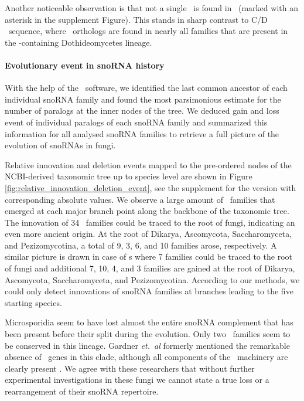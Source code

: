 Another noticeable observation is that not a single \haca\ is
found in \Ptt\ (marked with an asterisk in the supplement Figure). This stands in sharp contrast to C/D \sno\ sequence,
where \ptt\ orthologs are found in nearly all families that are
present in the \ptt-containing Dothideomycetes lineage.


\paragraph{\textbf{Evolutionary event in snoRNA history}}

With the help of the \epope\ software, we identified the last common ancestor of each individual snoRNA family and found the most parsimonious estimate for the number of paralogs at the inner nodes of the tree. 
We deduced gain and loss event of individual paralogs of each snoRNA family and summarized this information for all analysed snoRNA families to retrieve a full picture of the evolution of  snoRNAs in fungi.

Relative innovation and deletion events mapped to the pre-ordered
nodes of the NCBI-derived taxonomic tree up to species level are shown in
Figure \ref{fig:relative_innovation_deletion_event}, see the supplement for the version with corresponding absolute values.
We observe a large amount of \sno\ families that emerged at each
major branch point along the backbone of the taxonomic
tree. The innovation of 34 \cd\ families could be traced to the root of
fungi, indicating an even more ancient origin. At the root of 
Dikarya, Ascomycota, Saccharomyceta, and Pezizomycotina, a total
 of 9, 3, 6, and 10 families arose, respectively. A similar picture is drawn in
case of \haca s where 7 families could be traced to the root of
fungi and additional 7, 10, 4, and 3 families are gained at the root
of Dikarya, Ascomycota, Saccharomyceta, and Pezizomycotina. 
According to our methods, we could only detect innovations of snoRNA families at branches leading to the five starting species.  

Microsporidia seem to have lost almost the entire snoRNA complement that has been present before their split during the evolution. 
Only two \cd\ families seem to be conserved in this lineage. 
Gardner \emph{et.~al} formerly mentioned the remarkable absence of \sno\ genes in this clade, although all components of the \sno\ machinery are clearly present
\cite{Gardner:2010}. 
We agree with these researchers that without further experimental investigations in these fungi we cannot state a true loss or a rearrangement of their snoRNA repertoire. 

